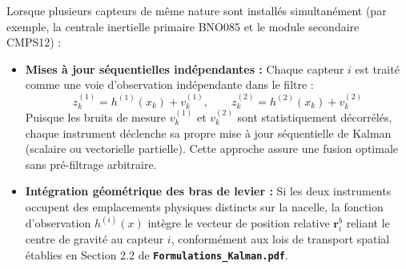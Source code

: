 \documentclass[../Implementation.tex]{subfiles}
\begin{document}
Lorsque plusieurs capteurs de même nature sont installés simultanément (par exemple, la centrale inertielle primaire BNO085 et le module secondaire CMPS12) :
\begin{itemize}
    \item \textbf{Mises à jour séquentielles indépendantes :}
    Chaque capteur $i$ est traité comme une voie d'observation indépendante dans le filtre :
    \begin{equation}
        z_k^{(1)} = h^{(1)}(x_k) + v_k^{(1)}, \qquad z_k^{(2)} = h^{(2)}(x_k) + v_k^{(2)}
    \end{equation}
    Puisque les bruits de mesure $v_k^{(1)}$ et $v_k^{(2)}$ sont statistiquement décorrélés, chaque instrument déclenche sa propre mise à jour séquentielle de Kalman (scalaire ou vectorielle partielle). Cette approche assure une fusion optimale sans pré-filtrage arbitraire.
    \item \textbf{Intégration géométrique des bras de levier :}
    Si les deux instruments occupent des emplacements physiques distincts sur la nacelle, la fonction d'observation $h^{(i)}(x)$ intègre le vecteur de position relative $\mathbf{r}_i^b$ reliant le centre de gravité au capteur $i$, conformément aux lois de transport spatial établies en Section 2.2 de \textbf{\texttt{Formulations\_Kalman.pdf}}.
\end{itemize}
\end{document}
